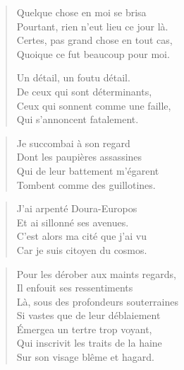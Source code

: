 \begin{verse}%
  \quatrain%
  Quelque chose en moi se brisa\\  %
  Pourtant, rien n’eut lieu ce jour là.\\  %
  Certes, pas grand chose en tout cas,\\  %
  Quoique ce fut beaucoup pour moi.

  Un détail, un foutu détail.\\  %
  De ceux qui sont déterminants,\\  %
  Ceux qui sonnent comme une faille,\\  %
  Qui s’annoncent fatalement.
\end{verse}

\begin{verse}%
  \quatrain%
  Je succombai à son regard\\
  Dont les paupières assassines\\
  Qui de leur battement m’égarent\\
  Tombent comme des guillotines.
\end{verse}

\begin{verse}%
  \quatrain%
  J’ai arpenté Doura-Europos\\  %
  Et ai sillonné ses avenues.\\  %
  C’est alors ma cité que j’ai vu\\  %
  Car je suis citoyen du cosmos.
\end{verse}

\begin{verse}%
  \quatrain%
  Pour les dérober aux maints regards,\\  %
  Il enfouit ses ressentiments\\  %
  Là, sous des profondeurs souterraines\\  %
  Si vastes que de leur déblaiement\\  %
  Émergea un tertre trop voyant,\\  %
  Qui inscrivit les traits de la haine\\  %
  Sur son visage blême et hagard.
\end{verse}



